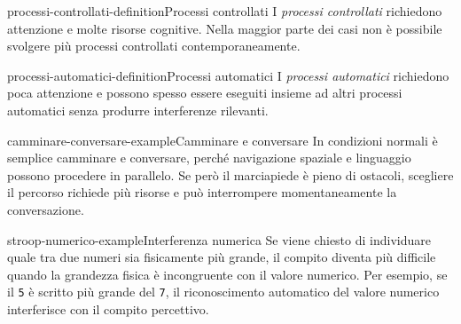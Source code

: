 \documentclass[preview]{standalone}
\begin{document}
\begin{snippetdefinition}{processi-controllati-definition}{Processi controllati}
    I \emph{processi controllati} richiedono attenzione e molte risorse
    cognitive. Nella maggior parte dei casi non è possibile svolgere più
    processi controllati contemporaneamente.
\end{snippetdefinition}

\begin{snippetdefinition}{processi-automatici-definition}{Processi automatici}
    I \emph{processi automatici} richiedono poca attenzione e possono spesso
    essere eseguiti insieme ad altri processi automatici senza produrre
    interferenze rilevanti.
\end{snippetdefinition}

\begin{snippetexample}{camminare-conversare-example}{Camminare e conversare}
    In condizioni normali è semplice camminare e conversare, perché navigazione
    spaziale e linguaggio possono procedere in parallelo. Se però il marciapiede
    è pieno di ostacoli, scegliere il percorso richiede più risorse e può
    interrompere momentaneamente la conversazione.
\end{snippetexample}

\begin{snippetexample}{stroop-numerico-example}{Interferenza numerica}
    Se viene chiesto di individuare quale tra due numeri sia fisicamente più
    grande, il compito diventa più difficile quando la grandezza fisica è
    incongruente con il valore numerico. Per esempio, se il \texttt{5} è scritto
    più grande del \texttt{7}, il riconoscimento automatico del valore numerico
    interferisce con il compito percettivo.
\end{snippetexample}

\end{document}
